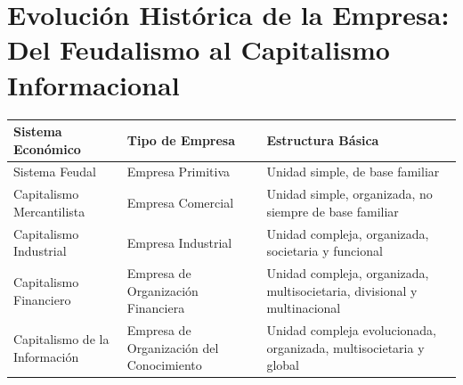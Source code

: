 \documentclass[
  man,
  floatsintext,
  longtable,
  a4paper,
  nolmodern,
  notxfonts,
  notimes,
  12pt,
  colorlinks=true,linkcolor=blue,citecolor=blue,urlcolor=blue]{apa7}
\newcounter{none} %
\begin{document}
\section{Evolución Histórica de la Empresa: Del Feudalismo al
Capitalismo
Informacional}\label{evoluciuxf3n-histuxf3rica-de-la-empresa-del-feudalismo-al-capitalismo-informacional}

{\def\LTcaptype{none} %
\begin{longtable}[]{@{}
  >{\raggedright\arraybackslash}p{}
  >{\raggedright\arraybackslash}p{}
  >{\raggedright\arraybackslash}p{}@{}}
\toprule\noalign{}
\begin{minipage}[b]{\linewidth}\raggedright
Sistema Económico
\end{minipage} & \begin{minipage}[b]{\linewidth}\raggedright
Tipo de Empresa
\end{minipage} & \begin{minipage}[b]{\linewidth}\raggedright
Estructura Básica
\end{minipage} \\
\midrule\noalign{}
\endhead
\bottomrule\noalign{}
\endlastfoot
Sistema Feudal & Empresa Primitiva & Unidad simple, de base familiar \\
Capitalismo Mercantilista & Empresa Comercial & Unidad simple,
organizada, no siempre de base familiar \\
Capitalismo Industrial & Empresa Industrial & Unidad compleja,
organizada, societaria y funcional \\
Capitalismo Financiero & Empresa de Organización Financiera & Unidad
compleja, organizada, multisocietaria, divisional y multinacional \\
Capitalismo de la Información & Empresa de Organización del Conocimiento
& Unidad compleja evolucionada, organizada, multisocietaria y global \\
\end{longtable}
}
\end{document}
